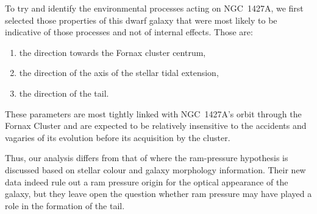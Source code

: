 To try and identify the environmental processes acting on NGC~1427A, we first selected those properties of this dwarf galaxy that were most likely to be indicative of those processes and not of internal effects. Those are:
\begin{enumerate}
    \item the direction towards the Fornax cluster centrum, 
    \item the direction of the axis of the stellar tidal extension,
    \item the direction of the \Hi{} tail.
\end{enumerate}
These parameters are most tightly linked with NGC~1427A's orbit through the Fornax Cluster and are expected to be relatively insensitive to the accidents and vagaries of its evolution before its acquisition by the cluster. 

Thus, our analysis differs from that of \citet{Lee-Waddell2018} where the ram-pressure hypothesis is discussed based on stellar colour and galaxy morphology information.
Their new data indeed rule out a ram pressure origin for the optical appearance of the galaxy, but they leave open the question whether ram pressure may have played a role in the formation of the \Hi{} tail.






